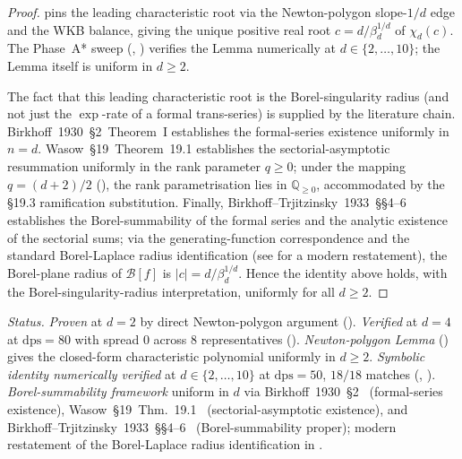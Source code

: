 \documentclass[11pt,reqno]{amsart}
\theoremstyle{plain}
\theoremstyle{definition}
\theoremstyle{remark}
\newcommand{\dps}{\mathrm{dps}}
\newcommand{\Borel}{\mathcal{B}}
\begin{document}
\begin{proof}
 pins the leading characteristic
root via the Newton-polygon slope-$1/d$ edge and the WKB
balance, giving the unique positive real root
$c = d/\beta_d^{1/d}$ of $\chi_d(c)$. The
Phase~A* sweep
(, \cite{siarc_q20a_phase_c_resume})
verifies the Lemma numerically at $d \in \{2,\ldots,10\}$;
the Lemma itself is uniform in $d \ge 2$.

The fact that this leading characteristic root is the
Borel-singularity radius (and not just the
$\exp$-rate of a formal trans-series) is supplied by the
literature chain. Birkhoff~1930~\S2~Theorem~I
\cite[\S2]{birkhoff1930formal} establishes the formal-series
existence uniformly in $n = d$. Wasow~\S19~Theorem~19.1
\cite[Thm.~19.1, eq.~(19.3)]{wasow1965asymptotic}
establishes the sectorial-asymptotic resummation
uniformly in the rank parameter $q \ge 0$; under the mapping
$q = (d+2)/2$ (), the rank
parametrisation lies in $\mathbb{Q}_{\ge 0}$, accommodated
by the \S19.3 ramification substitution. Finally,
Birkhoff--Trjitzinsky~1933~\S\S4--6
\cite[Lemma~8, Thm.~I, Lemma~9]{birkhoff_trjitzinsky_1933}
establishes the Borel-summability of the formal series and
the analytic existence of the sectorial sums; via the
generating-function correspondence and the standard
Borel-Laplace radius identification
(see \cite[ch.~5, \S5.0a]{costin2008asymptotics} for a
modern restatement), the Borel-plane radius of $\Borel[f]$
is $|c| = d/\beta_d^{1/d}$. Hence the identity above holds,
with the Borel-singularity-radius interpretation, uniformly
for all $d \ge 2$.
\end{proof}

\noindent\emph{Status.} \emph{Proven} at $d = 2$ by direct
Newton-polygon argument (). \emph{Verified}
at $d = 4$ at $\dps = 80$ with spread $0$ across $8$
representatives ().
\emph{Newton-polygon Lemma}
() gives the closed-form
characteristic polynomial uniformly in $d \ge 2$.
\emph{Symbolic identity numerically verified} at
$d \in \{2,\ldots,10\}$ at $\dps = 50$, $18/18$ matches
(,
\cite{siarc_q20a_phase_c_resume}).
\emph{Borel-summability framework} uniform in $d$ via
Birkhoff~1930~\S2~\cite{birkhoff1930formal} (formal-series
existence), Wasow~\S19~Thm.~19.1~\cite{wasow1965asymptotic}
(sectorial-asymptotic existence), and
Birkhoff--Trjitzinsky~1933~\S\S4--6~\cite{birkhoff_trjitzinsky_1933}
(Borel-summability proper); modern restatement of the
Borel-Laplace radius identification in
\cite[ch.~5]{costin2008asymptotics}.
\end{document}
